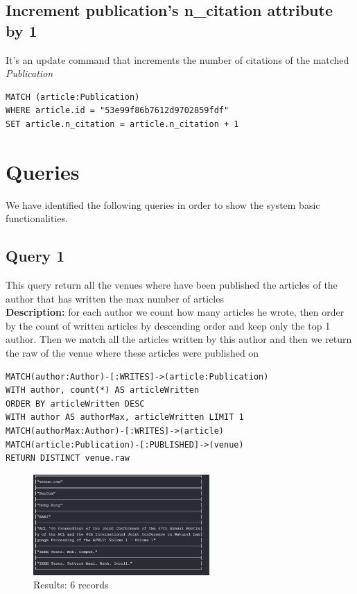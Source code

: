 \documentclass{Configuration_Files/PoliMi3i_thesis}
\begin{document}
\subsection{Increment publication's n\_citation attribute by 1}
It's an update command that increments the number of citations of the matched \emph{Publication}
\begin{lstlisting}[language=cypher, label=lst:cypher-example]
MATCH (article:Publication)
WHERE article.id = "53e99f86b7612d9702859fdf"
SET article.n_citation = article.n_citation + 1
\end{lstlisting}

\section{Queries}
We have identified the following queries in order to show the system basic functionalities.

\subsection{Query 1}
This query return all the venues where have been published the articles of the author that has written the max number of articles\\
\textbf{Description:} for each author we count how many articles he wrote, then order by the count of written articles by descending order and keep only the top 1 author.
Then we match all the articles written by this author and then we return the raw of the venue where these articles were published on
\begin{lstlisting}[language=cypher, label=lst:cypher-example]
MATCH(author:Author)-[:WRITES]->(article:Publication)
WITH author, count(*) AS articleWritten
ORDER BY articleWritten DESC
WITH author AS authorMax, articleWritten LIMIT 1
MATCH(authorMax:Author)-[:WRITES]->(article)
MATCH(article:Publication)-[:PUBLISHED]->(venue)
RETURN DISTINCT venue.raw
\end{lstlisting}
\begin{figure}[H]
\centering
\includegraphics[width=0.6\textwidth]{query/query1.PNG}
\caption{Results: 6 records}
\label{fig:query1}
\end{figure}
\end{document}
